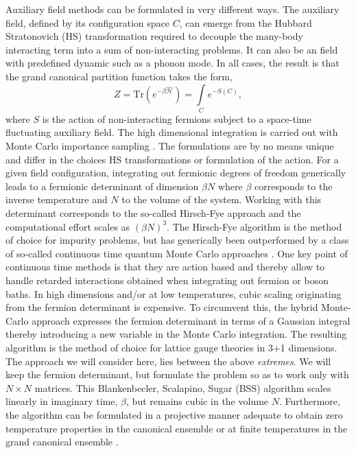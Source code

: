 Auxiliary field methods  can be formulated in very different ways.  The auxiliary field, defined by its configuration space $C$,  can emerge from the Hubbard Stratonovich (HS)  transformation required to decouple the  many-body interacting term into a sum of non-interacting problems.  It can also be an field with predefined dynamic such as a phonon mode.  In all cases, the result is that  the grand  canonical partition function  takes the form, 
\begin{equation}
	 Z = \text{Tr}\left( e^{-\beta \hat{\mathcal{H}}}\right)   = \int\limits_{C} e^{-S(C) },
\end{equation}
where  $S$  is the action of non-interacting fermions subject to a  space-time fluctuating auxiliary field.  The high dimensional  integration is carried out with Monte Carlo importance sampling \cite{Sokal89}.
The formulations are by no means unique and differ in the choices HS transformations or formulation of the action.  
For a given field configuration, integrating out  fermionic degrees of freedom generically leads to a fermionic determinant of dimension $\beta N$ where $\beta $  corresponds to the inverse temperature and $N$ to the volume of the system.  Working  with this determinant  corresponds to the so-called Hirsch-Fye approach \cite{HirschFye86}  and the computational effort scales as $\left( \beta N \right)^3$. The Hirsch-Fye  algorithm is the method of choice for impurity problems, but has  generically been outperformed by a class of so-called continuous time quantum Monte Carlo approaches  
\cite{Gull_rev,Assaad14_rev, Assaad07}.    One key point of continuous time methods  is that they are action based  and thereby allow to handle retarded interactions obtained when integrating out fermion or boson baths.  In high dimensions and/or at low temperatures, cubic scaling originating from the   fermion determinant is expensive.   To circumvent this,  the hybrid Monte-Carlo approach  \cite{Duane87}  expresses the fermion determinant in terms of a Gaussian integral thereby introducing a new variable in the Monte Carlo integration.    The resulting algorithm is the method of choice for lattice gauge theories in 3+1 dimensions. 
The approach we will consider here, lies between the  above {\it extremes}.  We will keep the fermion determinant, but formulate  the problem so as to  work only with $N\times N$ matrices.    This 
Blankenbecler,  Scalapino, Sugar (BSS)  algorithm scales linearly in  imaginary time, $\beta$, but remains cubic in the volume $N$.    Furthermore, the algorithm can be formulated in a projective manner \cite{Sugiyama86,Sorella89} adequate to obtain zero temperature properties in the  canonical ensemble or at finite temperatures in the  grand canonical ensemble \cite{White89}.


